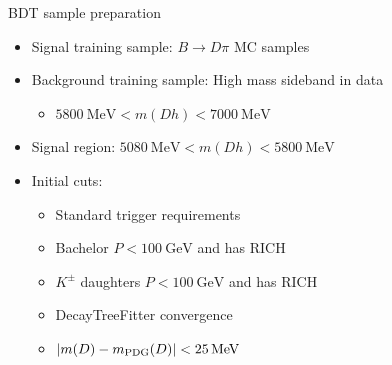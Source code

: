 \documentclass{beamer}
\begin{document}
\begin{frame}{BDT sample preparation}
  \begin{itemize}
    \setlength\itemsep{1.3em}
    \item{Signal training sample: $B\to D\pi$ MC samples}
    \item{Background training sample: High mass sideband in data}
    \begin{itemize}
      \item{$\SI{5800}{\mega\eV} < m(Dh) < \SI{7000}{\mega\eV}$}
    \end{itemize}
    \item{Signal region: $\SI{5080}{\mega\eV} < m(Dh) < \SI{5800}{\mega\eV}$}
    \item{Initial cuts:}
    \begin{itemize}
      \item{Standard trigger requirements}
      \item{Bachelor $P < \SI{100}{\giga\eV}$ and has RICH}
      \item{$K^\pm$ daughters $P < \SI{100}{\giga\eV}$ and has RICH}
      \item{DecayTreeFitter convergence}
      \item{$\abs{m(D) - m_\text{PDG}(D)} < \SI{25}{\mega\eV}$}
    \end{itemize}
  \end{itemize}
\end{frame}
\end{document}
